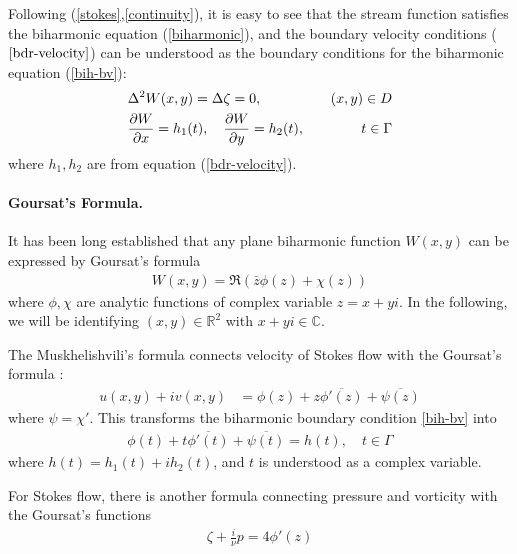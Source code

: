\documentclass[10pt,twocolumn]{article}
\begin{document}
Following (\ref{stokes},\ref{continuity}), it is easy to see that the stream function satisfies the biharmonic equation (\ref{biharmonic}),
and the boundary velocity conditions ($\ref{bdr-velocity}$) can be understood as the boundary conditions for the biharmonic equation (\ref{bih-bv}):
\begin{align}
  &\Delta^2 W(x,y) = \Delta \zeta = 0, &(x,y)\in D \label{biharmonic}\\
  &\pdv{W}{x}(t) = h_1(t),\quad \pdv{W}{y}(t) = h_2(t), \quad &t\in \Gamma\label{bih-bv}
\end{align}
where $h_1,h_2$ are from equation (\ref{bdr-velocity}).

\paragraph*{Goursat's Formula.} It has been long established that any plane biharmonic function $W(x,y)$ can be expressed by Goursat's formula 
\begin{align}
  W(x,y) = \Re (\bar z \phi(z) + \chi (z)) \label{Goursat}
\end{align}
where $\phi, \chi$ are analytic functions of complex variable $z = x+yi$. 
In the following, we will be identifying $(x,y) \in \mathbb{R}^2$ with $x + yi\in \mathbb{C}$. 


The Muskhelishvili's formula connects velocity of Stokes flow with the Goursat's formula \cite{muskhelishviliBasicProblemsMathematical1977}: 
\begin{align}
    u(x,y) + iv(x,y) 
    &= \phi(z) + z \overline{\phi'(z)} + \overline{\psi(z)}
    \label{muskhelishvili}
\end{align} where $\psi = \chi'$. This transforms the biharmonic boundary condition \eqref{bih-bv} into 
\begin{align}
  \phi(t) + t\overline{\phi'(t)} + \overline{\psi(t)} 
  = h(t), \quad
  t \in \Gamma
\end{align} where $h(t) =  h_1(t) + ih_2(t)$,  and $t$ is understood as a complex variable. 

For Stokes flow, there is another formula connecting pressure and vorticity with 
the Goursat's functions
\begin{align}
  \zeta + \frac{i}{\nu}p = 4\phi'(z) \label{pressure-and-vorticity}
\end{align}
\end{document}
